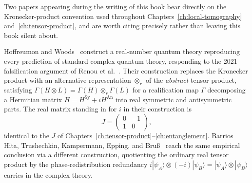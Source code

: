 Two papers appearing during the writing of this book bear directly on the
Kronecker-product convention used throughout Chapters~\ref{ch:local-tomography}
and~\ref{ch:tensor-product}, and are worth citing precisely rather than
leaving this book silent about.

Hoffreumon and Woods~\cite{hoffreumon-woods-2025} construct a real-number
quantum theory reproducing every prediction of standard complex quantum
theory, responding to the 2021 falsification argument of Renou et
al.~\cite{renou2021}. Their construction replaces the Kronecker product with
an alternative representation $\otimes_r$ of the \emph{abstract} tensor
product, satisfying $\Gamma(H \otimes L) = \Gamma(H) \otimes_r \Gamma(L)$ for
a realification map $\Gamma$ decomposing a Hermitian matrix $H = H^{\mathrm{
Sy}} + iH^{\mathrm{An}}$ into real symmetric and antisymmetric parts. The
real matrix standing in for $i$ in their construction is
\begin{equation}
J = \begin{pmatrix} 0 & -1 \\ 1 & 0 \end{pmatrix},
\end{equation}
identical to the $J$ of Chapters~\ref{ch:tensor-product}--\ref{ch:entanglement}.
Barrios Hita, Trushechkin, Kampermann, Epping, and Bru\ss~\cite{barrios-hita-2026}
reach the same empirical conclusion via a different construction, quotienting
the ordinary real tensor product by the phase-redistribution redundancy
$i|\psi_A\rangle \otimes (-i)|\psi_B\rangle = |\psi_A\rangle\otimes
|\psi_B\rangle$ carries in the complex theory.

